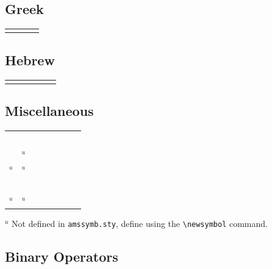 	\subsection{{} Greek \showfamily}

	\begin{tabular}{*4l}
	\X\digamma      &\X\varkappa
	\end{tabular}

	\subsection{{} Hebrew \showfamily}

	\begin{tabular}{*6l}
	\X\beth &\X\daleth      &\X\gimel
	\end{tabular}

	\subsection{{} Miscellaneous \showfamily}

	\begin{tabular}{*8l}
	\X\hbar         &\X\hslash      \\ \X\vartriangle &\X\triangledown      \\
	\X\square       &\X\lozenge     \\ \X\circledS    &\X\angle             \\
	\X\measuredangle&\X\nexists     \\ \X\mho         &\X\Finv$^u$          \\
	\X\Game$^u$     &\X\Bbbk$^u$    \\ \X\backprime   &\X\varnothing        \\
	\X\blacktriangle&\X\blacktriangledown \\ \X\blacksquare&\X\blacklozenge  \\
	\X\bigstar      &\X\sphericalangle     \\ \X\complement  &\X\eth       \\
	\X\diagup$^u$   &\X\diagdown$^u$
	\end{tabular}

	$^u$ Not defined in {\tt amssymb.sty}, define using the
	\verb|\newsymbol| command.

	\subsection{{} Binary Operators \showfamily}

